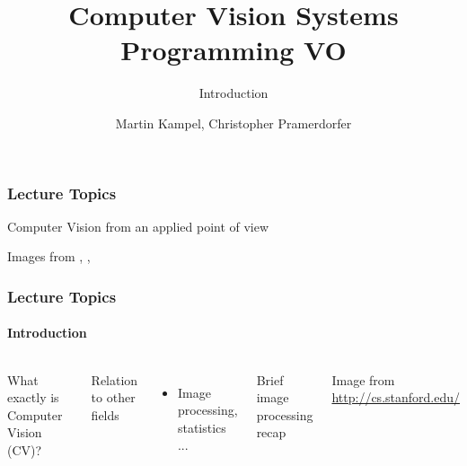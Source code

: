 \documentclass[xetex,professionalfont]{beamer}
\title{Computer Vision Systems Programming VO}
\subtitle{Introduction}
\author{Martin Kampel, Christopher Pramerdorfer}
\institute{Computer Vision Lab, Vienna University of Technology}
\begin{document}

\begin{frame}
\maketitle
\end{frame}


\begin{frame}
\frametitle{Lecture Topics}

\begin{center}
Computer Vision from an applied point of view
\end{center}

\bigskip
\begin{center}
	{\centering Images from \cite{lecun1989}, \cite{shotton2011}, \cite{taigman2013}}
\end{center}

\end{frame}


\begin{frame}
\frametitle{Lecture Topics}
\framesubtitle{Introduction}

\begin{columns}

What exactly is Computer Vision (CV)?

\bigskip
Relation to other fields
\begin{itemize}
	\item Image processing, statistics ...
\end{itemize}

\bigskip
Brief image processing recap


\begin{center}
	{\centering Image from \url{http://cs.stanford.edu/}}
\end{center}

\end{columns}

\end{frame}
\end{document}
